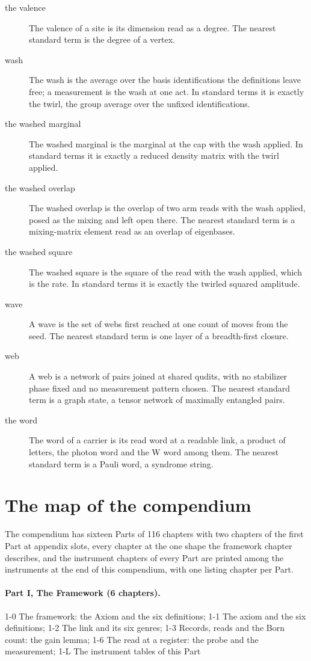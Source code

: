\begin{description}
\item[the valence] The valence of a site is its dimension read as a degree. The nearest standard term is the degree of a vertex.
\item[wash] The wash is the average over the basis identifications the definitions leave free; a measurement is the wash at one act. In standard terms it is exactly the twirl, the group average over the unfixed identifications.
\item[the washed marginal] The washed marginal is the marginal at the cap with the wash applied. In standard terms it is exactly a reduced density matrix with the twirl applied.
\item[the washed overlap] The washed overlap is the overlap of two arm reads with the wash applied, posed as the mixing and left open there. The nearest standard term is a mixing-matrix element read as an overlap of eigenbases.
\item[the washed square] The washed square is the square of the read with the wash applied, which is the rate. In standard terms it is exactly the twirled squared amplitude.
\item[wave] A wave is the set of webs first reached at one count of moves from the seed. The nearest standard term is one layer of a breadth-first closure.
\item[web] A web is a network of pairs joined at shared qudits, with no stabilizer phase fixed and no measurement pattern chosen. The nearest standard term is a graph state, a tensor network of maximally entangled pairs.
\item[the word] The word of a carrier is its read word at a readable link, a product of letters, the photon word and the W word among them. The nearest standard term is a Pauli word, a syndrome string.
\end{description}
\section*{The map of the compendium}\label{sec:map}\label{front:map}
The compendium has sixteen Parts of 116 chapters with two chapters of the first Part at appendix slots, every chapter at the one shape the framework chapter describes, and the instrument chapters of every Part are printed among the instruments at the end of this compendium, with one listing chapter per Part.
\paragraph{Part I, The Framework (6 chapters).} 1-0 The framework: the Axiom and the six definitions; 1-1 The axiom and the six definitions; 1-2 The link and its six genres; 1-3 Records, reads and the Born count: the gain lemma; 1-6 The read at a register: the probe and the measurement; 1-L The instrument tables of this Part
